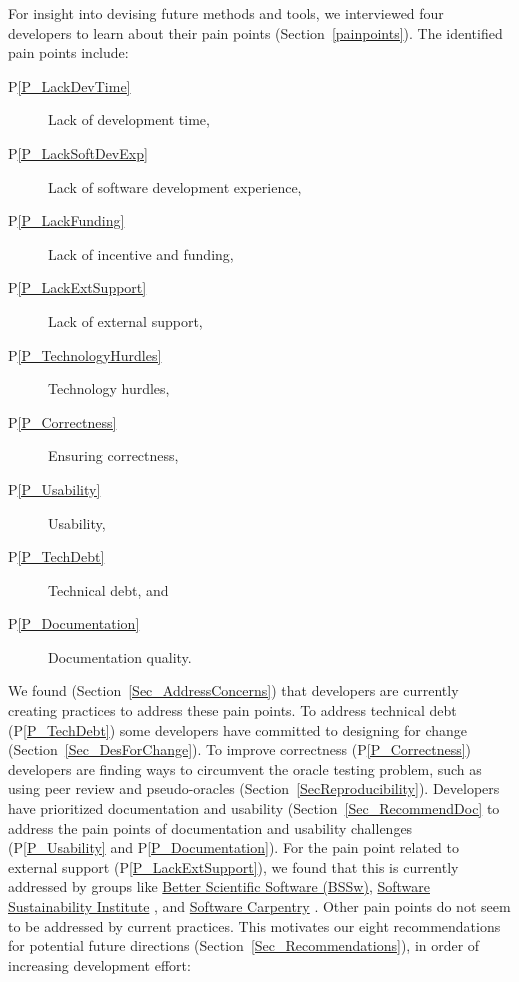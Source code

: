 \documentclass[final, 3p, times, authoryear]{elsarticle}
\newcommand{\ppref}[1]{P\ref{#1}}
\begin{document}
For insight into devising future methods and tools, we interviewed four
developers to learn about their pain points (Section~\ref{painpoints}).  The
identified pain points include: 

\begin{description}
\item [\ppref{P_LackDevTime}] Lack of development time, %
\item [\ppref{P_LackSoftDevExp}] Lack of software development experience, %
\item [\ppref{P_LackFunding}] Lack of incentive and funding, %
\item [\ppref{P_LackExtSupport}] Lack of external support, %
\item [\ppref{P_TechnologyHurdles}] Technology hurdles, %
\item [\ppref{P_Correctness}] Ensuring correctness, %
\item [\ppref{P_Usability}] Usability, %
\item [\ppref{P_TechDebt}] Technical debt, and %
\item [\ppref{P_Documentation}] Documentation quality. %
\end{description}  

We found (Section~\ref{Sec_AddressConcerns}) that developers are currently
creating practices to address these pain points.  To address technical debt
(\ppref{P_TechDebt}) some developers have committed to designing for change
(Section~\ref{Sec_DesForChange}). To improve correctness (\ppref{P_Correctness})
developers are finding ways to circumvent the oracle testing problem, such as
using peer review and pseudo-oracles (Section~\ref{SecReproducibility}).
Developers have prioritized documentation and usability
(Section~\ref{Sec_RecommendDoc} to address the pain points of documentation and
usability challenges (\ppref{P_Usability} and \ppref{P_Documentation}).  For the
pain point related to external support (\ppref{P_LackExtSupport}), we found that
this is currently addressed by groups like \href{https://bssw.io/} {Better
Scientific Software (BSSw)},
\href{https://www.software.ac.uk/} {Software Sustainability Institute}
\citep{CrouchEtAl2013}, and \href{https://software-carpentry.org/}{Software
Carpentry} \citep{WilsonAndLumsdaine2006, Wilson2016}. Other pain points do not
seem to be addressed by current practices.  This motivates our eight
recommendations for potential future directions
(Section~\ref{Sec_Recommendations}), in order of increasing development effort:
\end{document}

